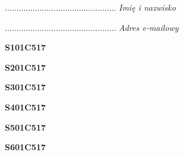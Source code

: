 \begin{turn}{90}\begin{minipage}{\linewidth} \vspace{20mm} ................................................  \textit{Imię i nazwisko}\end{minipage}\end{turn}

\begin{turn}{90}\begin{minipage}{\linewidth} \vspace{20mm} ................................................  \textit{Adres e-mailowy}\end{minipage}\end{turn}

\begin{turn}{90}\huge \begin{minipage}{\linewidth} \vspace{10mm}\textbf{S101C517}\end{minipage}\end{turn}

\begin{turn}{90}\huge \begin{minipage}{\linewidth} \vspace{10mm}\textbf{S201C517}\end{minipage}\end{turn}

\begin{turn}{90}\huge \begin{minipage}{\linewidth} \vspace{10mm}\textbf{S301C517}\end{minipage}\end{turn}

\begin{turn}{90}\huge \begin{minipage}{\linewidth} \vspace{10mm}\textbf{S401C517}\end{minipage}\end{turn}

\begin{turn}{90}\huge \begin{minipage}{\linewidth} \vspace{10mm}\textbf{S501C517}\end{minipage}\end{turn}

\begin{turn}{90}\huge \begin{minipage}{\linewidth} \vspace{10mm}\textbf{S601C517}\end{minipage}\end{turn}

